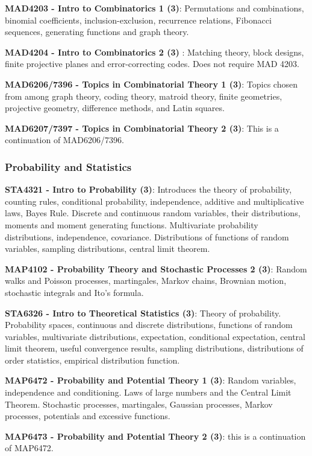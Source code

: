 \documentclass[11pt]{article}
\begin{document}
\textbf{MAD4203 - Intro to Combinatorics 1 (3)}: Permutations and combinations, binomial coefficients, inclusion-exclusion, recurrence relations, Fibonacci sequences, generating functions and graph theory.

\textbf{MAD4204 - Intro to Combinatorics 2 (3)
}: Matching theory, block designs, finite projective planes and error-correcting codes. Does not require MAD 4203.

\textbf{MAD6206/7396 - Topics in Combinatorial Theory 1 (3)}: Topics chosen from among graph theory, coding theory, matroid theory, finite geometries, projective geometry, difference methods, and Latin squares.

\textbf{MAD6207/7397 - Topics in Combinatorial Theory 2 (3)}: This is a continuation of MAD6206/7396.

\subsubsection{\colorbox{prob}{Probability and Statistics}}

\textbf{STA4321 - Intro to Probability (3)}: Introduces the theory of probability, counting rules, conditional probability, independence, additive and multiplicative laws, Bayes Rule. Discrete and continuous random variables, their distributions, moments and moment generating functions. Multivariate probability distributions, independence, covariance. Distributions of functions of random variables, sampling distributions, central limit theorem.

\textbf{MAP4102 - Probability Theory and Stochastic Processes 2 (3)}: Random walks and Poisson processes, martingales, Markov chains, Brownian motion, stochastic integrals and Ito's formula.

\textbf{STA6326 - Intro to Theoretical Statistics (3)}: Theory of probability. Probability spaces, continuous and discrete distributions, functions of random variables, multivariate distributions, expectation, conditional expectation, central limit theorem, useful convergence results, sampling distributions, distributions of order statistics, empirical distribution function.

\textbf{MAP6472 - Probability and Potential Theory 1 (3)}: Random variables, independence and conditioning. Laws of large numbers and the Central Limit Theorem. Stochastic processes, martingales, Gaussian processes, Markov processes, potentials and excessive functions.

\textbf{MAP6473 - Probability and Potential Theory 2 (3)}: this is a continuation of MAP6472.
\end{document}
